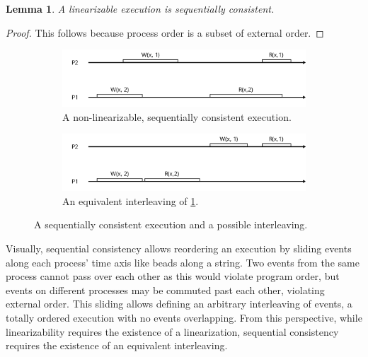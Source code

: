 \documentclass[]             %
{NASA}                       %
\newtheorem{lemma}[theorem]{Lemma}
\theoremstyle{definition}
\begin{document}
\begin{lemma}
\label{lem:linearsequential}
    A linearizable execution is sequentially consistent.
\end{lemma}
\begin{proof}
This follows because process order is a subset of external order.
\end{proof}

\begin{figure}
     \begin{subfigure}[a]{1\textwidth}
         \center
         \includegraphics[scale=0.4]{images/sequential1.png}
         \caption{A non-linearizable, sequentially consistent execution.}
         \label{fig:sequential1}
     \end{subfigure}
     \begin{subfigure}[b]{1\textwidth}
         \center
         \includegraphics[scale=0.4]{images/sequential2.png}
         \caption{An equivalent interleaving of \ref{fig:sequential1}.}
         \label{fig:interleaving1}
     \end{subfigure}
     \caption{A sequentially consistent execution and a possible interleaving.}
     \label{fig:sequential}
\end{figure}

Visually, sequential consistency allows reordering an execution by
sliding events along each process' time axis like beads along a string.
Two events from the same process cannot pass over each other as this
would violate program order, but events on different processes may be
commuted past each other, violating external order. This sliding allows
defining an arbitrary interleaving of events, a totally ordered
execution with no events overlapping. From this perspective, while
linearizability requires the existence of a linearization, sequential
consistency requires the existence of an equivalent interleaving.
\end{document}

